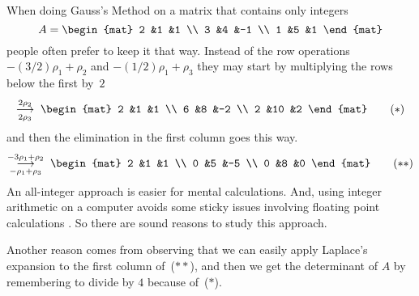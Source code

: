 
When doing Gauss's Method on a matrix that contains only integers
\begin{equation*}
  A=
  \begin{mat}
    2 &1 &1 \\
    3 &4 &-1 \\
    1 &5 &1 
  \end{mat}
\end{equation*}
people often prefer to keep it that way.
Instead of the row operations $-(3/2)\rho_1+\rho_2$ and
$-(1/2)\rho_1+\rho_3$ they may start by multiplying the rows below the first
by~$2$
\begin{equation*}
  \grstep[2\rho_3]{2\rho_2}\;
  \begin{mat}
    2 &1 &1 \\
    6 &8 &-2 \\
    2 &10 &2 
  \end{mat}
  \tag{$*$}
\end{equation*}
and then the elimination in the first column goes this way.
\begin{equation*}
  \grstep[-\rho_1+\rho_3]{-3\rho_1+\rho_2}\;
  \begin{mat}
    2 &1 &1 \\
    0 &5 &-5 \\
    0 &8 &0 
  \end{mat}
  \tag{$**$}
\end{equation*}
An all-integer approach is easier for mental calculations. 
And, using integer arithmetic on a computer
avoids some sticky issues involving floating point calculations \cite{Kahan}.
So there are sound reasons to study this approach.

Another reason comes from
observing that we can easily apply Laplace's expansion to the 
first column of~($**$), and then we get the determinant of $A$ by 
remembering to divide by $4$ because of~($*$).

